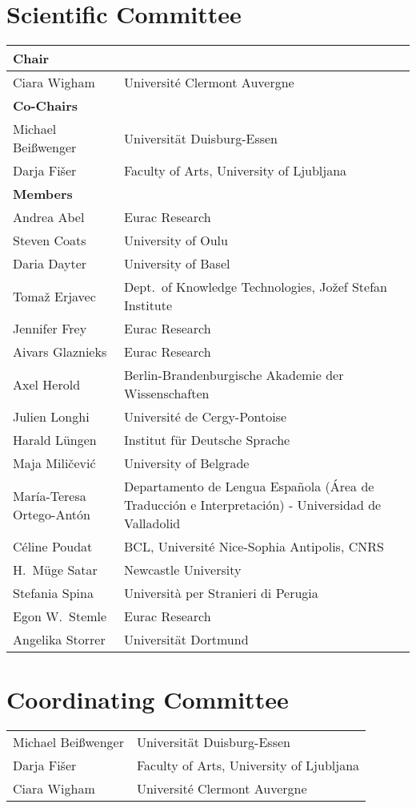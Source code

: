 \section*{Scientific Committee}
\begin{longtable}{p{}p{}} %
       \textbf{Chair} \\ \hline
    Ciara Wigham & Universit\'e Clermont Auvergne  %
       \medskip \\ \textbf{Co-Chairs} \\ \hline
    Michael Bei{\ss}wenger & Universit\"at Duisburg-Essen\\
    Darja Fi\v{s}er & Faculty of Arts, University of Ljubljana %
       \medskip\\ \textbf{Members} \\ \hline
    Andrea Abel & Eurac Research\\
    Steven Coats & University of Oulu\\
    Daria Dayter & University of Basel\\
    Toma\v{z} Erjavec & Dept.~of Knowledge Technologies, Jo\v{z}ef Stefan Institute\\
    Jennifer Frey & Eurac Research\\
    Aivars Glaznieks & Eurac Research\\
    Axel Herold & Berlin-Brandenburgische Akademie der Wissenschaften\\
    Julien Longhi & Universit\'e de Cergy-Pontoise\\
    Harald L\"ungen & Institut f\"ur Deutsche Sprache\\
    Maja Mili\v{c}evi\'c & University of Belgrade\\
    Mar\'ia-Teresa Ortego-Ant\'on & Departamento de Lengua Espa\~{n}ola (\'Area de Traducci\'on e Interpretaci\'on) - Universidad de Valladolid\\
    C\'eline Poudat & BCL, Universit\'e Nice-Sophia Antipolis, CNRS\\
    H.~M\"uge Satar & Newcastle University\\
    Stefania Spina & Universit\`a per Stranieri di Perugia\\
    Egon W.~Stemle & Eurac Research\\
    Angelika Storrer & Universit\"at Dortmund\\
\end{longtable}

\bigskip
\section*{Coordinating Committee}
\begin{longtable}{p{}p{}}
    Michael Bei{\ss}wenger & Universit\"at Duisburg-Essen\\
    Darja Fi\v{s}er & Faculty of Arts, University of Ljubljana\\
    Ciara Wigham & Universit\'e Clermont Auvergne\\
\end{longtable}

